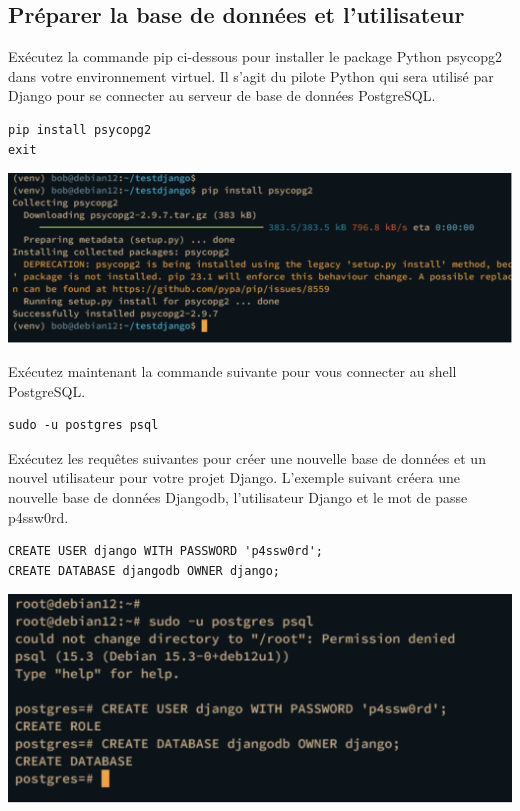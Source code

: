 \documentclass{article}
\begin{document}
\subsection{Préparer la base de données et l'utilisateur}
Exécutez la commande pip ci-dessous pour installer le package Python psycopg2 dans votre environnement virtuel. Il s'agit du pilote Python qui sera utilisé par Django pour se connecter au serveur de base de données PostgreSQL.


\begin{verbatim}
pip install psycopg2
exit
\end{verbatim}

\begin{center}
\includegraphics[width=15cm]{images/image08.png}
\end{center}

Exécutez maintenant la commande suivante pour vous connecter au shell PostgreSQL.

\begin{verbatim}
sudo -u postgres psql
\end{verbatim}

Exécutez les requêtes suivantes pour créer une nouvelle base de données et un nouvel utilisateur pour votre projet Django. L'exemple suivant créera une nouvelle base de données Djangodb, l'utilisateur Django et le mot de passe p4ssw0rd.

\begin{verbatim}
CREATE USER django WITH PASSWORD 'p4ssw0rd';
CREATE DATABASE djangodb OWNER django;
\end{verbatim}

\begin{center}
\includegraphics[width=15cm]{images/image09.png}
\end{center}
\end{document}
